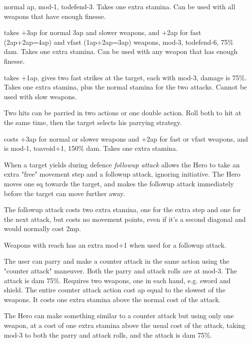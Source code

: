  normal ap, mod-1, todefend-3. Takes one extra stamina. Can be used with all weapons that have enough finesse.


 takes +3ap for normal 3ap and slower weapons, and +2ap for fast (2ap+2ap=4ap) and vfast (1ap+2ap=3ap) weapons, mod-3, todefend-6, 75\% dam. Takes one extra stamina. Can be used with any weapon that has enough finesse.


 takes +1ap, gives two fast strikes at the target, each with mod-3, damage is 75\%. Takes one extra stamina, plus the normal stamina for the two attacks. Cannot be used with slow weapons.

Two hits can be parried in two actions or one double action. Roll both to hit at the same time, then the target selects his parrying strategy.


 costs +3ap for normal or slower weapons and +2ap for fast or vfast weapons, and is mod-1, toavoid+1, 150\% dam. Takes one extra stamina.


 When a target yields during defence \emph{followup attack} allows the Hero to take an extra "free" movement step and a followup attack, ignoring initiative. The Hero moves one sq towards the target, and makes the followup attack immediately before the target can move further away.

The followup attack costs two extra stamina, one for the extra step and one for the next attack, but costs no movement points, even if it's a second diagonal and would normally cost 2mp.

Weapons with reach has an extra mod+1 when used for a followup attack.


 The user can parry and make a counter attack in the same action using the "counter attack" maneuver. Both the parry and attack rolls are at mod-3. The attack is dam 75\%. Requires two weapons, one in each hand, e.g. sword and shield. The entire counter attack action cost ap equal to the slowest of the weapons. It costs one extra stamina above the normal cost of the attack.


 The Hero can make something similar to a counter attack but using only one weapon, at a cost of one extra stamina above the usual cost of the attack, taking mod-3 to both the parry and attack rolls, and the attack is dam 75\%.


